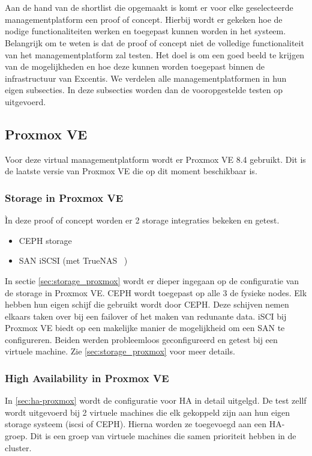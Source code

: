 
\chapter{}%
\label{ch:poc}

Aan de hand van de shortlist die opgemaakt is komt er voor elke geselecteerde managementplatform een proof of concept. Hierbij wordt er gekeken hoe de nodige functionaliteiten werken en toegepast kunnen worden in het systeem.
Belangrijk om te weten is dat de proof of concept niet de volledige functionaliteit van het managementplatform zal testen. Het doel is om een goed beeld te krijgen van de mogelijkheden en hoe deze kunnen worden toegepast binnen de infrastructuur van Excentis. 
We verdelen alle managementplatformen in hun eigen subsecties. In deze subsecties worden dan de vooropgestelde testen op uitgevoerd.
\section{Proxmox VE}%
Voor deze virtual managementplatform wordt er Proxmox VE 8.4 gebruikt. Dit is de laatste versie van Proxmox VE die op dit moment beschikbaar is.
\subsection{Storage in Proxmox VE}
Ìn deze proof of concept worden er 2 storage integraties bekeken en getest.
\begin{itemize}
    \item CEPH storage
    \item SAN iSCSI (met TrueNAS ~\autocite{truenas})
\end{itemize}
In sectie \autoref{sec:storage_proxmox} wordt er dieper ingegaan op de configuratie van de storage in Proxmox VE.
CEPH wordt toegepast op alle 3 de fysieke nodes. Elk hebben hun eigen schijf die gebruikt wordt door CEPH. Deze schijven nemen elkaars taken over bij een failover of het maken van redunante data.
iSCI bij Proxmox VE biedt op een makelijke manier de mogelijkheid om een SAN te configureren. 
Beiden werden probleemloos geconfigureerd en getest bij een virtuele machine. Zie \ref{sec:storage_proxmox} voor meer details.
\subsection{High Availability in Proxmox VE}
In \autoref{sec:ha-proxmox} wordt de configuratie voor HA in detail uitgelgd.
De test zellf wordt uitgevoerd bij 2 virtuele machines die elk gekoppeld zijn aan hun eigen storage systeem (iscsi of CEPH).
Hierna worden ze toegevoegd aan een HA-groep. Dit is een groep van virtuele machines die samen prioriteit hebben in de cluster.

